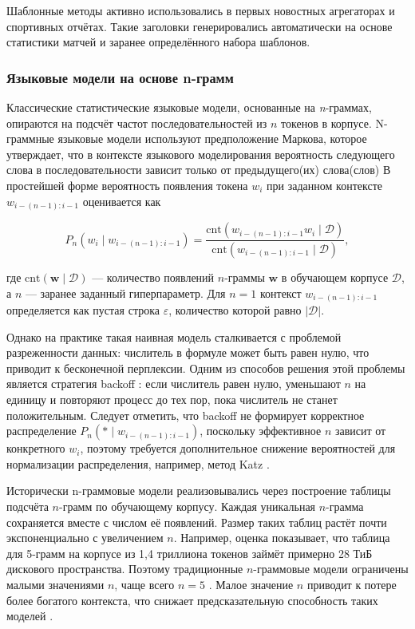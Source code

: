 \documentclass[coursework]{SCWorks}
\begin{document}
    Шаблонные методы активно использовались в первых новостных агрегаторах и спортивных отчётах.
    Такие заголовки генерировались автоматически на основе статистики матчей и заранее определённого набора шаблонов.

    \subsubsection{Языковые модели на основе n-грамм}

    Классические статистические языковые модели, основанные на \emph{n}-граммах, опираются на подсчёт
    частот последовательностей из $n$ токенов в корпусе.
    N-граммные языковые модели используют предположение Маркова, которое утверждает, что в контексте языкового
    моделирования вероятность следующего слова в последовательности зависит только от предыдущего(их) слова(слов)
    В простейшей форме вероятность появления токена $w_i$ при заданном контексте $w_{i-(n-1):i-1}$ оценивается как

    \begin{equation}
        P_n(w_i \mid w_{i-(n-1):i-1}) = \frac{\mathrm{cnt}(w_{i-(n-1):i-1} w_i \mid \mathcal{D})}{\mathrm{cnt}(w_{i-(n-1):i-1} \mid \mathcal{D})},\label{eq:equation}
    \end{equation}

    где $\mathrm{cnt}(\mathbf{w} \mid \mathcal{D})$ — количество появлений $n$-граммы $\mathbf{w}$ в обучающем корпусе
    $\mathcal{D}$, а $n$ — заранее заданный гиперпараметр.
    Для $n=1$ контекст $w_{i-(n-1):i-1}$ определяется как пустая строка $\varepsilon$, количество которой равно $|\mathcal{D}|$.

    Однако на практике такая наивная модель сталкивается с проблемой разреженности данных:
    числитель в формуле может быть равен нулю, что приводит к бесконечной перплексии.
    Одним из способов решения этой проблемы является стратегия backoff \cite{jurafsky2000speech}:
    если числитель равен нулю, уменьшают $n$ на единицу и повторяют процесс до тех пор, пока числитель не станет положительным.
    Следует отметить, что backoff не формирует корректное распределение $P_n(* \mid w_{i-(n-1):i-1})$,
    поскольку эффективное $n$ зависит от конкретного $w_i$,
    поэтому требуется дополнительное снижение вероятностей для нормализации распределения,
    например, метод Katz \cite{katz1987estimation}.

    Исторически n-граммовые модели реализовывались через построение таблицы подсчёта $n$-грамм по обучающему корпусу.
    Каждая уникальная $n$-грамма сохраняется вместе с числом её появлений.
    Размер таких таблиц растёт почти экспоненциально с увеличением $n$.
    Например, оценка показывает, что таблица для 5-грамм на корпусе из 1,4 триллиона токенов займёт примерно 28 ТиБ дискового пространства.
    Поэтому традиционные $n$-граммовые модели ограничены малыми значениями $n$, чаще всего $n=5$ \cite{franz2006n, aiden2011digital}.
    Малое значение $n$ приводит к потере более богатого контекста, что снижает предсказательную способность таких моделей \cite{liu2024infini}.
\end{document}
